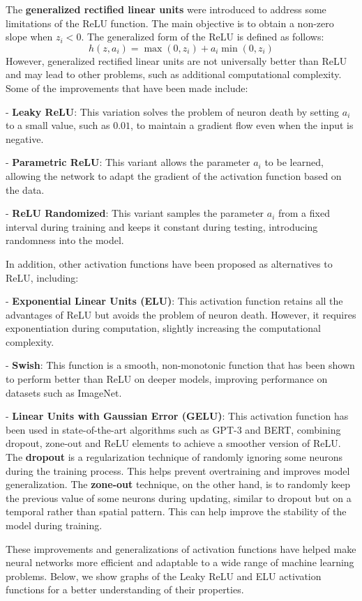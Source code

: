 The \textbf{generalized rectified linear units} were introduced to address some limitations of the ReLU function. The main objective is to obtain a non-zero slope when \( z_i < 0 \). The generalized form of the ReLU is defined as follows:
$$ h(z, a_i) = \max(0, z_i) + a_i \min(0, z_i) $$
However, generalized rectified linear units are not universally better than ReLU and may lead to other problems, such as additional computational complexity. Some of the improvements that have been made include:

- \textbf{Leaky ReLU}: This variation solves the problem of neuron death by setting \( a_i \) to a small value, such as $0.01$, to maintain a gradient flow even when the input is negative.

- \textbf{Parametric ReLU}: This variant allows the parameter \( a_i \) to be learned, allowing the network to adapt the gradient of the activation function based on the data.

- \textbf{ReLU Randomized}: This variant samples the parameter \( a_i \) from a fixed interval during training and keeps it constant during testing, introducing randomness into the model.

In addition, other activation functions have been proposed as alternatives to ReLU, including:

- \textbf{Exponential Linear Units (ELU)}: This activation function retains all the advantages of ReLU but avoids the problem of neuron death. However, it requires exponentiation during computation, slightly increasing the computational complexity.

- \textbf{Swish}: This function is a smooth, non-monotonic function that has been shown to perform better than ReLU on deeper models, improving performance on datasets such as ImageNet.

- \textbf{Linear Units with Gaussian Error (GELU)}: This activation function has been used in state-of-the-art algorithms such as GPT-3 and BERT, combining dropout, zone-out and ReLU elements to achieve a smoother version of ReLU. The \textbf{dropout} is a regularization technique of randomly ignoring some neurons during the training process. This helps prevent overtraining and improves model generalization. The \textbf{zone-out} technique, on the other hand, is to randomly keep the previous value of some neurons during updating, similar to dropout but on a temporal rather than spatial pattern. This can help improve the stability of the model during training.

These improvements and generalizations of activation functions have helped make neural networks more efficient and adaptable to a wide range of machine learning problems. Below, we show graphs of the Leaky ReLU and ELU activation functions for a better understanding of their properties.

